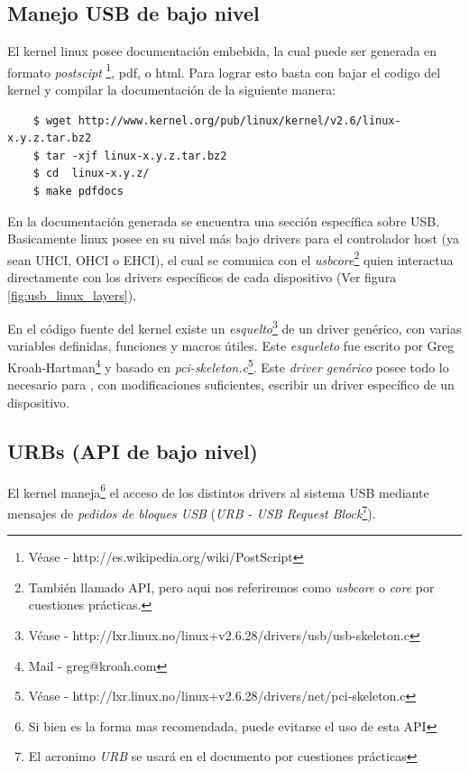 \subsection{Manejo USB de bajo nivel}

El kernel linux posee documentaci\'on embebida, la cual puede ser generada en
formato \emph{postscipt} \footnote{V\'ease -
http://es.wikipedia.org/wiki/PostScript}, pdf, o html. Para lograr esto basta
con bajar el codigo del kernel y compilar la documentaci\'on de la siguiente
manera:

\begin{scriptsize}
	\begin{verbatim}
	$ wget http://www.kernel.org/pub/linux/kernel/v2.6/linux-x.y.z.tar.bz2
	$ tar -xjf linux-x.y.z.tar.bz2
	$ cd  linux-x.y.z/
	$ make pdfdocs
	\end{verbatim}
\end{scriptsize}

En la documentaci\'on generada se encuentra una secci\'on espec\'ifica sobre
USB.\\

Basicamente linux posee en su nivel m\'as bajo drivers para el controlador
host (ya sean UHCI, OHCI o EHCI), el cual se comunica con el
\emph{usbcore}\footnote{Tambi\'en llamado API, pero aqui nos referiremos como
\emph{usbcore} o \emph{core} por cuestiones pr\'acticas.} quien interactua
directamente con los drivers espec\'ificos de cada dispositivo (Ver figura
\ref{fig:usb_linux_layers}).


En el c\'odigo fuente del kernel existe un \emph{esquelto}\footnote{V\'ease
- http://lxr.linux.no/linux+v2.6.28/drivers/usb/usb-skeleton.c} de un driver
gen\'erico, con varias variables definidas, funciones y macros \'utiles.
Este \emph{esqueleto} fue escrito por Greg Kroah-Hartman\footnote{Mail - 
greg@kroah.com} y basado en \emph{pci-skeleton.c}\footnote{V\'ease -
http://lxr.linux.no/linux+v2.6.28/drivers/net/pci-skeleton.c}.
Este \emph{driver gen\'erico} posee todo lo necesario para , con
modificaciones suficientes, escribir un driver espec\'ifico de un dispositivo.


\subsection{URBs (API de bajo nivel)}

El kernel maneja\footnote{Si bien es la forma mas recomendada, puede evitarse
el uso de esta API} el acceso de los distintos drivers al sistema USB mediante
mensajes de \emph{pedidos de bloques USB} (\emph{URB - USB Request
Block}\footnote{El acronimo \emph{URB} se usar\'a en el documento por
cuestiones pr\'acticas}).\\

